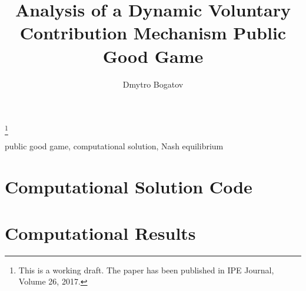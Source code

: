 \documentclass{style}		%
\begin{document}
	\begin{frontmatter}

		\title{Analysis of a Dynamic Voluntary Contribution Mechanism Public Good Game} 

		\thanks[footnoteinfo]{This is a working draft. The paper has been published in IPE Journal, Volume 26, 2017.}

		\author{Dmytro Bogatov} 

		\address{Worcester Polytechnic Institute, Worcester, MA 01609 USA \\ (e-mail: dmytro@dbogatov.org)}

		

		\begin{keyword}
			public good game, computational solution, Nash equilibrium
		\end{keyword}

	\end{frontmatter}
	

	
													
	\appendix

		\section{Computational Solution Code}
		\section{Computational Results}
	
\end{document}
